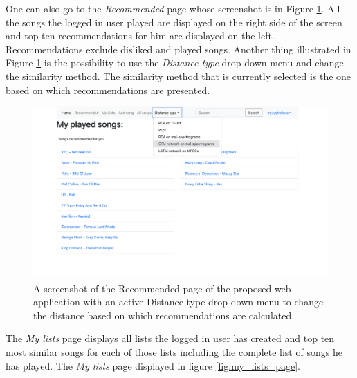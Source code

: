 One can also go to the \textit{Recommended} page whose screenshot is in Figure \ref{fig:recommended_page}. All the songs the logged in user played are displayed on the right side of the screen and top ten recommendations for him are displayed on the left. Recommendations exclude disliked and played songs. Another thing illustrated in Figure \ref{fig:recommended_page} is the possibility to use the \textit{Distance type} drop-down menu and change the similarity method. The similarity method that is currently selected is the one based on which recommendations are presented. 
\begin{figure}[H]
    \centering
	\includegraphics[width=1\linewidth]{./img/recommended_page.png}
	\caption{A screenshot of the Recommended page of the proposed web application with an active Distance type drop-down menu to change the distance based on which recommendations are calculated.}
	\label{fig:recommended_page}
\end{figure}
The \textit{My lists} page displays all lists the logged in user has created and top ten most similar songs for each of those lists including the complete list of songs he has played. The \textit{My lists} page displayed in figure \ref{fig:my_lists_page}.  \\
